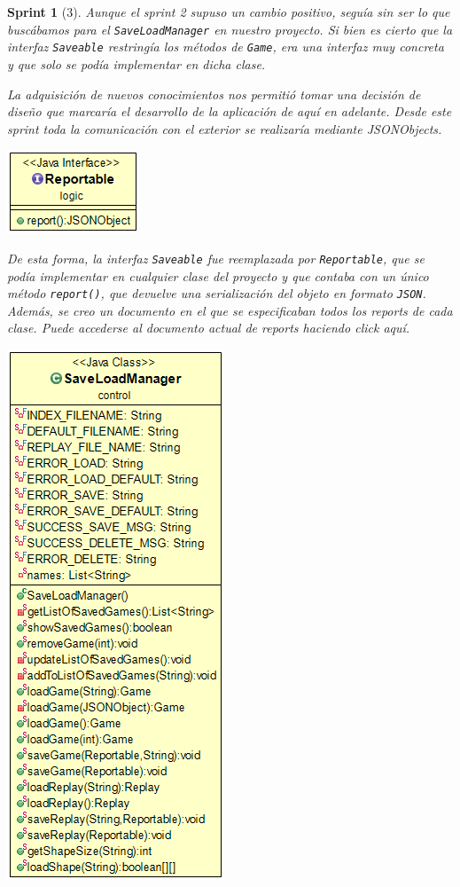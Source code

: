 \documentclass[12pt,a4paper,openright]{book}
\theoremstyle{break}
\newtheorem*{sprint}{Sprint}
\begin{document}
\begin{sprint}[3]
Aunque el sprint 2 supuso un cambio positivo, seguía sin ser lo que buscábamos para el \texttt{SaveLoadManager} en nuestro proyecto. Si bien es cierto que la interfaz \texttt{Saveable} restringía los métodos de \texttt{Game}, era una interfaz muy concreta y que solo se podía implementar en dicha clase.

La adquisición de nuevos conocimientos nos permitió tomar una decisión de diseño que marcaría el desarrollo de la aplicación de aquí en adelante. Desde este sprint toda la comunicación con el exterior se realizaría mediante JSONObjects.

\begin{center}
\centering
\includegraphics[scale=0.5]{reportable.png}
\end{center}

De esta forma, la interfaz \texttt{Saveable} fue reemplazada por \texttt{Reportable}, que se podía implementar en cualquier clase del proyecto y que contaba con un único método \texttt{report()}, que devuelve una serialización del objeto en formato \texttt{JSON}. Además, se creo un documento en el que se especificaban todos los reports de cada clase. Puede accederse al documento actual de reports haciendo click aquí. %


\begin{center}
\centering
\includegraphics[scale=0.5]{save-load-manager-sprint3.png}
\end{center}


\end{sprint}
\end{document}
